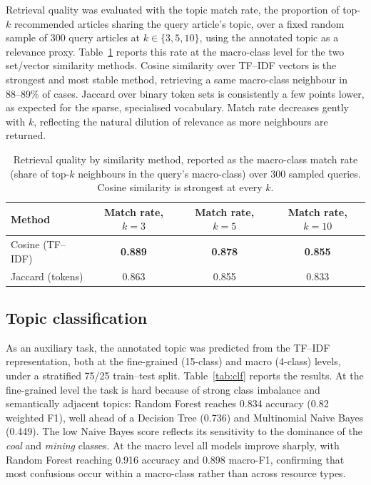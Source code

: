 \documentclass[fleqn,10pt]{wlscirep}
\begin{document}
Retrieval quality was evaluated with the topic match rate, the proportion of top-$k$ recommended articles sharing the query article's topic, over a fixed random sample of 300 query articles at $k \in \{3,5,10\}$, using the annotated topic as a relevance proxy. Table~\ref{tab:retrieval} reports this rate at the macro-class level for the two set/vector similarity methods. Cosine similarity over TF--IDF vectors is the strongest and most stable method, retrieving a same macro-class neighbour in 88--89\% of cases. Jaccard over binary token sets is consistently a few points lower, as expected for the sparse, specialised vocabulary. Match rate decreases gently with $k$, reflecting the natural dilution of relevance as more neighbours are returned.

\begin{table}[ht]
\centering
\begin{tabular}{lccc}
\toprule
Method & Match rate, $k{=}3$ & Match rate, $k{=}5$ & Match rate, $k{=}10$ \\
\midrule
Cosine (TF--IDF)  & \textbf{0.889} & \textbf{0.878} & \textbf{0.855} \\
Jaccard (tokens)  & 0.863 & 0.855 & 0.833 \\
\bottomrule
\end{tabular}
\caption{\label{tab:retrieval}Retrieval quality by similarity method, reported as the macro-class match rate (share of top-$k$ neighbours in the query's macro-class) over 300 sampled queries. Cosine similarity is strongest at every $k$.}
\end{table}

\subsection*{Topic classification}

As an auxiliary task, the annotated topic was predicted from the TF--IDF representation, both at the fine-grained (15-class) and macro (4-class) levels, under a stratified 75/25 train--test split. Table~\ref{tab:clf} reports the results. At the fine-grained level the task is hard because of strong class imbalance and semantically adjacent topics: Random Forest \cite{breiman2001random} reaches 0.834 accuracy (0.82 weighted F1), well ahead of a Decision Tree (0.736) and Multinomial Naive Bayes (0.449). The low Naive Bayes score reflects its sensitivity to the dominance of the \emph{coal} and \emph{mining} classes. At the macro level all models improve sharply, with Random Forest reaching 0.916 accuracy and 0.898 macro-F1, confirming that most confusions occur within a macro-class rather than across resource types.
\end{document}

